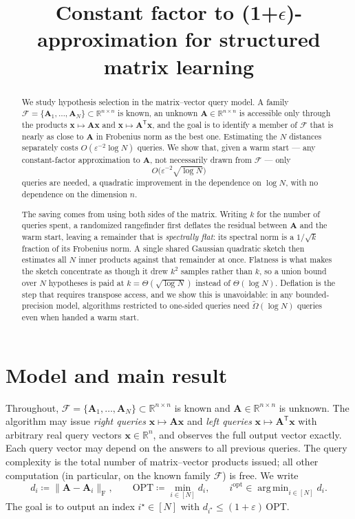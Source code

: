 \documentclass{article}
\title{Constant factor to (1+$\epsilon$)-approximation for structured matrix learning}
\author{}
\date{}
\renewcommand{\vec}[1]{\mathbf{#1}}          %
\newcommand{\T}{\mathsf{T}}                  %
\newcommand{\F}{\mathrm{F}}                  %
\newcommand{\eps}{\varepsilon}
\newcommand{\cF}{\mathcal{F}}
\newcommand{\OPT}{\mathrm{OPT}}
\newcommand{\iopt}{i^\mathrm{opt}}
\DeclareMathOperator*{\argmin}{arg\,min}
\theoremstyle{remark}
\begin{document}
\maketitle

\begin{abstract}
We study hypothesis selection in the matrix--vector query model.
A family $\cF = \{\vec{A}_1, \dots, \vec{A}_N\} \subset \mathbb{R}^{n \times n}$ is known, an unknown $\vec{A} \in \mathbb{R}^{n \times n}$ is accessible only through the products $\vec{x} \mapsto \vec{A}\vec{x}$ and $\vec{x} \mapsto \vec{A}^\T\vec{x}$, and the goal is to identify a member of $\cF$ that is nearly as close to $\vec{A}$ in Frobenius norm as the best one.
Estimating the $N$ distances separately costs $O(\eps^{-2}\log N)$ queries.
We show that, given a warm start --- any constant-factor approximation to $\vec{A}$, not necessarily drawn from $\cF$ --- only
\[
O\bigl( \eps^{-2}\sqrt{\log N} \bigr)
\]
queries are needed, a quadratic improvement in the dependence on $\log N$, with no dependence on the dimension $n$.

The saving comes from using both sides of the matrix.
Writing $k$ for the number of queries spent, a randomized rangefinder first deflates the residual between $\vec{A}$ and the warm start, leaving a remainder that is \emph{spectrally flat}: its spectral norm is a $1/\sqrt k$ fraction of its Frobenius norm.
A single shared Gaussian quadratic sketch then estimates all $N$ inner products against that remainder at once.
Flatness is what makes the sketch concentrate as though it drew $k^2$ samples rather than $k$, so a union bound over $N$ hypotheses is paid at $k = \Theta(\sqrt{\log N})$ instead of $\Theta(\log N)$.
Deflation is the step that requires transpose access, and we show this is unavoidable: in any bounded-precision model, algorithms restricted to one-sided queries need $\widetilde\Omega(\log N)$ queries even when handed a warm start.
\end{abstract}

\section{Model and main result}\label{sec:model}


Throughout, $\cF = \{\vec{A}_1, \dots, \vec{A}_N\} \subset \mathbb{R}^{n \times n}$ is known and $\vec{A} \in \mathbb{R}^{n \times n}$ is unknown.
The algorithm may issue \emph{right queries} $\vec{x} \mapsto \vec{A}\vec{x}$ and \emph{left queries} $\vec{x} \mapsto \vec{A}^\T\vec{x}$ with arbitrary real query vectors $\vec{x} \in \mathbb{R}^n$, and observes the full output vector exactly.
Each query vector may depend on the answers to all previous queries.
The query complexity is the total number of matrix--vector products issued; all other computation (in particular, on the known family $\cF$) is free.
We write
\begin{equation}\label{eq:opt}
d_i \coloneqq \|\vec{A} - \vec{A}_i\|_\F,
\qquad
\OPT \coloneqq \min_{i \in [N]} d_i,
\qquad
\iopt \in \argmin_{i \in [N]} d_i .
\end{equation}
The goal is to output an index $i^\star \in [N]$ with $d_{i^\star} \le (1+\eps)\,\OPT$.
\end{document}

